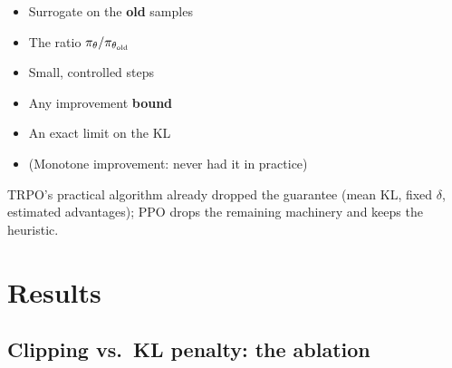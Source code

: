 \begin{pair}
\begin{keybox}[title={Kept from CPI and TRPO}]
\begin{itemize}
  \item Surrogate on the \textbf{old} samples
  \item The ratio $\pi_\theta/\pi_{\theta_{\mathrm{old}}}$
  \item Small, controlled steps
\end{itemize}
\end{keybox}
\begin{warnbox}[title={Given up}]
\begin{itemize}
  \item Any improvement \textbf{bound}
  \item An exact limit on the KL
  \item (Monotone improvement: never had it in practice)
\end{itemize}
\end{warnbox}
\end{pair}

{\small TRPO's practical algorithm already dropped the guarantee (mean KL, fixed $\delta$, estimated advantages); PPO drops the remaining machinery and keeps the heuristic.}

\section{Results}

\subsection{Clipping vs.\ KL penalty: the ablation}
\label{sec:ppo-ablation}

